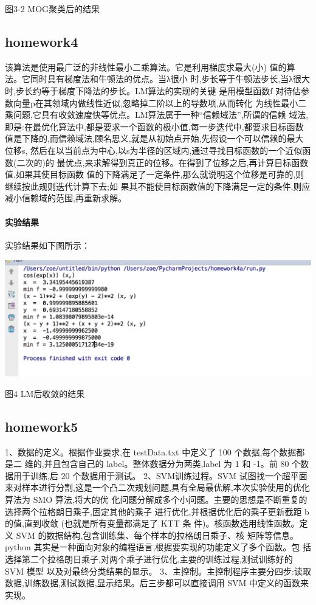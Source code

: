 \documentclass[10pt,a4paper]{article}
\theoremstyle{mythm}%
\numberwithin{equation}{section}
\begin{document}
图3-2 MOG聚类后的结果
\subsection{homework4}

该算法是使用最广泛的非线性最小二乘算法。它是利用梯度求最大(小) 值的算法。它同时具有梯度法和牛顿法的优点。当λ很小 时,步长等于牛顿法步长,当λ很大时,步长约等于梯度下降法的步长。LM算法的实现的关键 是用模型函数f 对待估参数向量p在其领域内做线性近似,忽略掉二阶以上的导数项,从而转化 为线性最小二乘问题,它具有收敛速度快等优点。LM算法属于一种“信赖域法”,所谓的信赖 域法,即是:在最优化算法中,都是要求一个函数的极小值,每一步迭代中,都要求目标函数 值是下降的,而信赖域法,顾名思义,就是从初始点开始,先假设一个可以信赖的最大位移s, 然后在以当前点为中心,以s为半径的区域内,通过寻找目标函数的一个近似函数(二次的)的 最优点,来求解得到真正的位移。在得到了位移之后,再计算目标函数值,如果其使目标函数 值的下降满足了一定条件,那么就说明这个位移是可靠的,则继续按此规则迭代计算下去;如 果其不能使目标函数值的下降满足一定的条件,则应减小信赖域的范围,再重新求解。

 \paragraph{实验结果}实验结果如下图所示：
 
 \includegraphics[height=2in]{figure4.png} 
 
图4  LM后收敛的结果




\subsection{homework5}

1、数据的定义。根据作业要求,在 testData.txt 中定义了 100 个数据,每个数据都是二 维的,并且包含自己的 label。整体数据分为两类,label 为 1 和 -1。前 80 个数据用于训练,后 20 个数据用于测试。
2、SVM训练过程。SVM 试图找一个超平面来对样本进行分割,这是一个凸二次规划问题,具有全局最优解,本次实验使用的优化算法为 SMO 算法,将大的优 化问题分解成多个小问题。主要的思想是不断重复的选择两个拉格朗日乘子,固定其他的乘子 进行优化,并根据优化后的乘子更新截距 b 的值,直到收敛 (也就是所有变量都满足了 KTT 条 件)。核函数选用线性函数。定义 SVM 的数据结构,包含训练集、每个样本的拉格朗日乘子、核 矩阵等信息。python 其实是一种面向对象的编程语言,根据要实现的功能定义了多个函数。包 括选择第二个拉格朗日乘子,对两个乘子进行优化,主要的训练过程,测试训练好的 SVM 模型
以及对最终分类结果的显示。
3、主控制。主控制程序主要分四步:读取数据,训练数据,测试数据,显示结果。后三步都可以直接调用 SVM 中定义的函数来实现。
\end{document}

